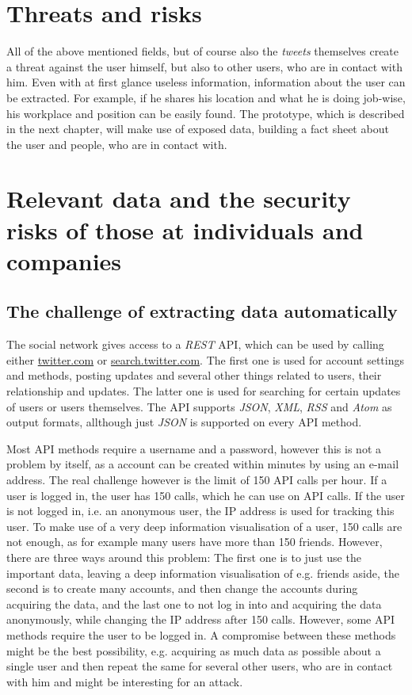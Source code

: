 \section{Threats and risks}

All of the above mentioned fields, but of course also the \textit{tweets}
themselves create a threat against the user himself, but also to other users,
who are in contact with him. Even with at first glance useless information,
information about the user can be extracted. For example, if he shares his
location and what he is doing job-wise, his workplace and position can be
easily found. The prototype, which is described in the next chapter, will make
use of exposed data, building a fact sheet about the user and people, who are
in contact with.

\section{Relevant data and the security risks of those at individuals and companies}
\label{sec:relevant_data}

\subsection{The challenge of extracting data automatically}

The \Twitter{} social network gives access to a \textit{REST} API, which can be
used by calling either \url{twitter.com} or \url{search.twitter.com}. The first
one is used for account settings and methods, posting updates and several other
things related to users, their relationship and updates. The latter one is used
for searching for certain updates of users or users themselves. The API
supports \textit{JSON}, \textit{XML}, \textit{RSS} and \textit{Atom} as output
formats, allthough just \textit{JSON} is supported on every API method.

Most API methods require a username and a password, however this is not a
problem by itself, as a \Twitter{} account can be created within minutes by
using an e-mail address. The real challenge however is the limit of 150 API calls
per hour. If a user is logged in, the user has 150 calls, which he can use on
API calls. If the user is not logged in, i.e. an anonymous user, the IP address
is used for tracking this user. To make use of a very deep information
visualisation of a user, 150 calls are not enough, as for example many users
have more than 150 friends. However, there are three ways around this problem:
The first one is to just use the important data, leaving a deep information
visualisation of e.g. friends aside, the second is to create many accounts, and
then change the accounts during acquiring the data, and the last one to not log
in into \Twitter{} and acquiring the data anonymously, while changing the IP
address after 150 calls. However, some API methods require the user to be
logged in. A compromise between these methods might be the best possibility,
e.g. acquiring as much data as possible about a single user and then repeat the
same for several other users, who are in contact with him and might be
interesting for an attack.

